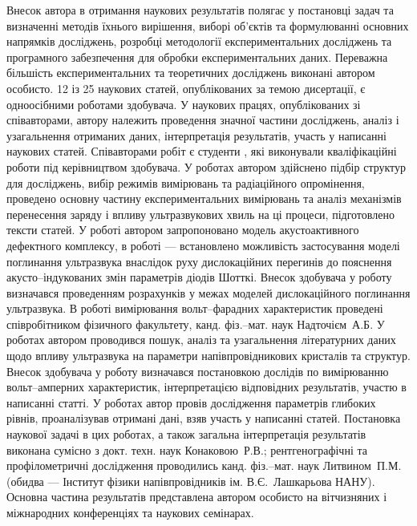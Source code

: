 {\contributionTXT}
Внесок автора в отримання наукових результатів полягає у постановці задач
та визначенні методів їхнього вирішення, виборі об'єктів та формулюванні
основних напрямків досліджень,
розробці методології експериментальних досліджень та програмного забезпечення для обробки експериментальних даних.
Переважна більшість експериментальних та теоретичних досліджень виконані автором особисто.
12 із 25 наукових статей, опублікованих за темою дисертації, є одноосібними роботами здобувача.
У наукових працях, опублікованих зі співавторами, автору належить проведення значної частини досліджень, аналіз і узагальнення отриманих
даних, інтерпретація результатів, участь у написанні наукових статей.
Співавторами робіт \cite{Olikh2018JAP,Olikh:Ultras2016,Olikh2016JSem,OlikhJAP,Olikh:PZTF2006} є студенти \thesisOfOrganization,
які виконували кваліфікаційні роботи під керівництвом здобувача.
У роботах \cite{Olikh2018JAP,Olikh:Ultras2016,Olikh2016JSem,OlikhJAP,Olikh:SEMT2007,Olikh:MRS2007a,Olikh:PZTF2006} автором здійснено підбір структур для досліджень, вибір режимів вимірювань та радіаційного опромінення,
проведено основну частину експериментальних вимірювань та аналіз механізмів перенесення заряду і впливу ультразвукових хвиль на ці процеси,
підготовлено тексти статей.
У роботі \cite{Olikh2018JAP} автором запропоновано модель акустоактивного дефектного комплексу,
в роботі \cite{Olikh:Ultras2016} --- встановлено можливість застосування моделі поглинання ультразвука внаслідок руху дислокаційних перегинів до пояснення акусто--індукованих змін параметрів діодів Шотткі.
Внесок здобувача у роботу \cite{Olikh:UPJ2014} визначався проведенням розрахунків у межах моделей дислокаційного поглинання ультразвука.
В роботі \cite{Olikh:UPJ2013} вимірювання вольт--фарадних характеристик  проведені співробітником фізичного факультету, канд. фіз.--мат. наук Надточієм~А.\:Б.
У роботах \cite{Olikh:SEMT2004,Olikh:SEMT2011} автором проводився пошук, аналіз та узагальнення літературних даних щодо впливу ультразвука на параметри напівпровідникових кристалів та структур.
Внесок здобувача у роботу \cite{Gorb2010} визначався постановкою дослідів по вимірюванню вольт--амперних характеристик,
інтерпретацією відповідних результатів,
участю в написанні статті.
У роботах \cite{Olikh:PhChOM2005,Olikh:PJE2004} автор провів дослідження параметрів глибоких рівнів,
проаналізував отримані дані, взяв участь у написанні статей.
Постановка наукової задачі в цих роботах, а також загальна інтерпретація результатів виконана сумісно з докт. техн. наук Конаковою~Р.\:В.;
рентгенографічні та профілометричні дослідження проводились канд. фіз.--мат. наук Литвином~П.\:М.  (обидва --- Інститут фізики напівпровідників ім. В.\:Є.~Лашкарьова НАНУ).
Основна частина результатів
представлена автором особисто на вітчизняних і міжнародних конференціях
та наукових семінарах.






